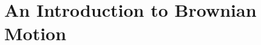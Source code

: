 \documentclass[../../main.tex]{subfiles}
\begin{document}
\chapter{An Introduction to Brownian Motion}
\end{document}
